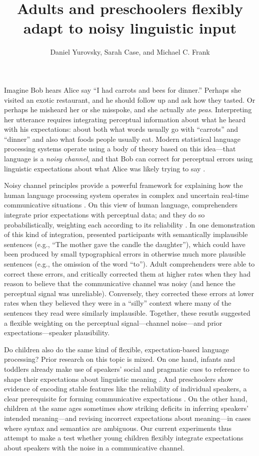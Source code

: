 \documentclass[man,floatsintext]{apa6}
\title{Adults and preschoolers flexibly adapt to noisy linguistic input}
\author{Daniel Yurovsky, Sarah Case, and Michael C. Frank}
\affiliation{Stanford University}
\begin{document}
\maketitle

Imagine Bob hears Alice say ``I had carrots and bees for dinner.'' Perhaps she visited an exotic restaurant, and he should follow up and ask how they tasted. Or perhaps he misheard her or she misspoke, and she actually ate \emph{peas}. Interpreting her utterance requires integrating perceptual information about what he heard with his expectations: about both what words usually go with ``carrots'' and ``dinner'' and also what foods people usually eat. Modern statistical language processing systems operate using a body of theory based on this idea---that language is a \emph{noisy channel}, and that Bob can correct for perceptual errors using linguistic expectations about what Alice was likely trying to say \cite{jelinek1976, shannon1948}. 

Noisy channel principles provide a powerful framework for explaining how the human language processing system operates in complex and uncertain real-time communicative situations \cite{clayards2008, levy2008, jaeger2010, kleinschmidt2015}. On this view of human language, comprehenders integrate prior expectations with perceptual data; and they do so probabilistically, weighting each according to its reliability \cite{ernst2002, jacobs1999}. In one demonstration of this kind of integration,  presented participants with semantically implausible sentences (e.g., ``The mother gave the candle the daughter''), which could have been produced by small typographical errors in otherwise much more plausible sentences (e.g., the omission of the word ``to''). Adult comprehenders were able to correct these errors, and critically corrected them at higher rates when they had reason to believe that the communicative channel was noisy (and hence the perceptual signal was unreliable). Conversely, they corrected these errors at lower rates when they believed they were in a ``silly'' context where many of the sentences they read were similarly implausible. Together, these resutls suggested a flexible weighting on the perceptual signal---channel noise---and prior expectations---speaker plausibility. 

Do children also do the same kind of flexible, expectation-based language processing? Prior research on this topic is mixed. On one hand, infants and toddlers already make use of speakers' social and pragmatic cues to reference to shape their expectations about linguistic meaning \cite{clark2009, carpenter1998}. And preschoolers show evidence of encoding stable features like the reliability of individual speakers, a clear prerequisite for forming communicative expectations \cite{koenig2004, harris2012}. On the other hand, children at the same ages sometimes show striking deficits in inferring speakers' intended meaning---and revising incorrect expectations about meaning---in cases where syntax \cite{trueswell1999} and semantics \cite{noveck2001} are ambiguous. Our current experiments thus attempt to make a test whether young children flexibly integrate expectations about speakers with the noise in a communicative channel. 
\end{document}
